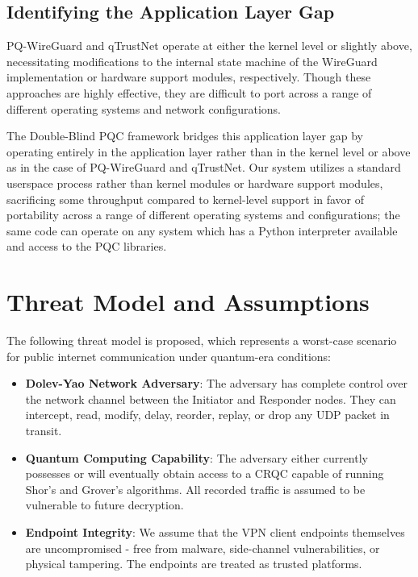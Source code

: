\documentclass[10pt, conference, letterpaper]{IEEEtran}
\begin{document}
\subsection{Identifying the Application Layer Gap}
PQ-WireGuard and qTrustNet operate at either the kernel level or slightly above, necessitating modifications to the internal state machine of the WireGuard implementation or hardware support modules, respectively. Though these approaches are highly effective, they are difficult to port across a range of different operating systems and network configurations.

The Double-Blind PQC framework bridges this application layer gap by operating entirely in the application layer rather than in the kernel level or above as in the case of PQ-WireGuard and qTrustNet. Our system utilizes a standard userspace process rather than kernel modules or hardware support modules, sacrificing some throughput compared to kernel-level support in favor of portability across a range of different operating systems and configurations; the same code can operate on any system which has a Python interpreter available and access to the PQC libraries.

\section{Threat Model and Assumptions}
The following threat model is proposed, which represents a worst-case scenario for public internet communication under quantum-era conditions:

\begin{itemize}
    \item \textbf{Dolev-Yao Network Adversary}: The adversary has complete control over the network channel between the Initiator and Responder nodes. They can intercept, read, modify, delay, reorder, replay, or drop any UDP packet in transit.
    \item \textbf{Quantum Computing Capability}: The adversary either currently possesses or will eventually obtain access to a CRQC capable of running Shor's and Grover's algorithms. All recorded traffic is assumed to be vulnerable to future decryption.
    \item \textbf{Endpoint Integrity}: We assume that the VPN client endpoints themselves are uncompromised - free from malware, side-channel vulnerabilities, or physical tampering. The endpoints are treated as trusted platforms.
\end{itemize}
\end{document}
